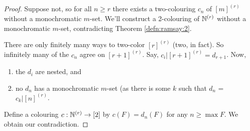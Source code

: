 \begin{proof}
  Suppose not, so for all $n \geq r$ there exists a two-colouring
  $c_{n}$ of $[m]^{(r)}$ without a monochromatic $m$-set.  We'll
  construct a 2-colouring of $\mathbb{N}^{(r)}$ without a monochromatic
  $m$-set, contradicting Theorem \ref{defn:ramsay:2}.

  There are only finitely many ways to two-color $[r]^{(r)}$ (two, in
  fact). So infinitely many of the $c_{n}$ agree on $[r + 1]^{(r)}$.
  Say, $c_{i} | [r+1]^{(r)} = d_{r+1}$. Now, 
  \begin{enumerate}
  \item the $d_{i}$ are nested, and
  \item no $d_{n}$ has a monochromatic $m$-set (as there is some $k$
    such that $d_{n}$ = $c_{k} | [n]^{(r)}$.
  \end{enumerate}

  Define a colouring $c: \mathbb{N}^{(r)} \rightarrow [2]$ by $c(F) =
  d_{n}(F)$ for any $n \geq \max F$.  We obtain our contradiction.

\end{proof}

